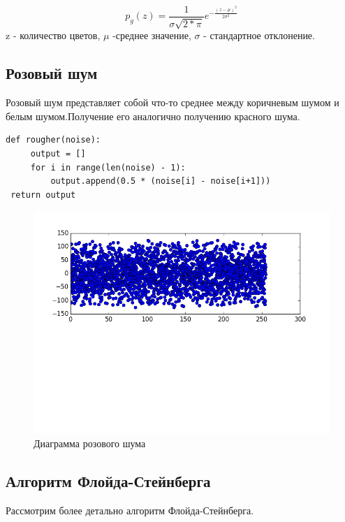  \begin{equation}
 p_g(z)=\frac{1}{\sigma\sqrt{2*\pi}}e^{-\frac{(z-\mu)^2}{2\sigma^2}}
 \end{equation}
 z - количество цветов, $\mu$ -среднее значение, $\sigma$ - стандартное отклонение.
 \subsection{Розовый шум}
 Розовый шум представляет собой что-то среднее между коричневым шумом и белым шумом.Получение его аналогично получению красного шума.
 \begin{lstlisting}[style=pseudocode,caption={Получение розового шума}]
 def rougher(noise):
     output = []
     for i in range(len(noise) - 1):
         output.append(0.5 * (noise[i] - noise[i+1]))
 return output
 \end{lstlisting}
   \begin{figure}[h]
   	\centering
     \includegraphics[width=\textwidth]{img/4_pink_noise.png}
   	\caption{Диаграмма розового шума}
   	\label{fig:spire02}
    \end{figure}
 \subsection{Алгоритм Флойда-Стейнберга}
 Рассмотрим более детально алгоритм Флойда-Стейнберга.


